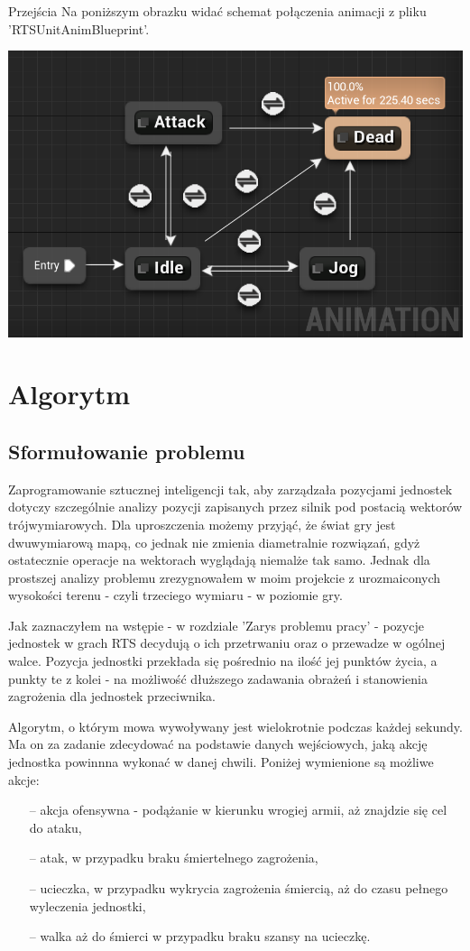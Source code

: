 \documentclass[12pt]{report}
\begin{document}
Przejścia
Na poniższym obrazku widać schemat połączenia animacji z pliku 'RTSUnitAnimBlueprint'.

\includegraphics[scale=0.6]{animGraph.png}


\chapter{Algorytm}
\section{Sformułowanie problemu}
Zaprogramowanie sztucznej inteligencji tak, aby zarządzała pozycjami jednostek dotyczy szczególnie analizy pozycji zapisanych przez silnik pod postacią wektorów trójwymiarowych. Dla uproszczenia możemy przyjąć, że świat gry jest dwuwymiarową mapą, co jednak nie zmienia diametralnie rozwiązań, gdyż ostatecznie operacje na wektorach wyglądają niemalże tak samo. Jednak dla prostszej analizy problemu zrezygnowałem w moim projekcie z urozmaiconych wysokości terenu - czyli trzeciego wymiaru - w poziomie gry.

Jak zaznaczyłem na wstępie - w rozdziale 'Zarys problemu pracy' - pozycje jednostek w grach RTS decydują o ich przetrwaniu oraz o przewadze w ogólnej walce. Pozycja jednostki przekłada się pośrednio na ilość jej punktów życia, a punkty te z kolei - na możliwość dłuższego zadawania obrażeń i stanowienia zagrożenia dla jednostek przeciwnika.

Algorytm, o którym mowa wywoływany jest wielokrotnie podczas każdej sekundy. Ma on za zadanie zdecydować na podstawie danych wejściowych, jaką akcję jednostka powinnna wykonać w danej chwili. Poniżej wymienione są możliwe akcje:
\begin{itemize}
\item[--] akcja ofensywna - podążanie w kierunku wrogiej armii, aż znajdzie się cel do ataku,
\item[--] atak, w przypadku braku śmiertelnego zagrożenia,
\item[--] ucieczka, w przypadku wykrycia zagrożenia śmiercią, aż do czasu pełnego wyleczenia jednostki,
\item[--] walka aż do śmierci w przypadku braku szansy na ucieczkę.
\end{itemize}
\end{document}

